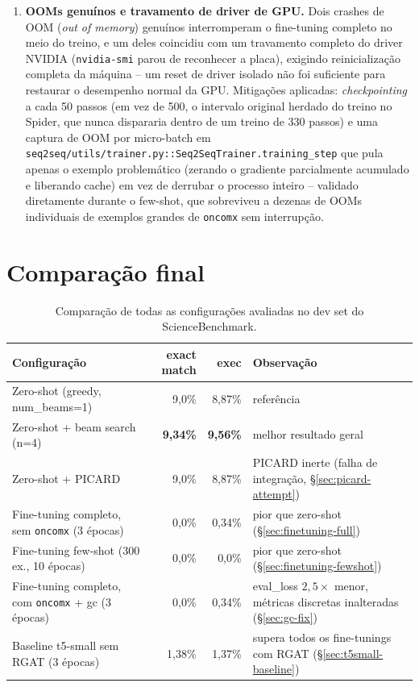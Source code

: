 \begin{enumerate}
\item[(vi)] \textbf{OOMs genuínos e travamento de driver de GPU.} Dois
crashes de OOM (\emph{out of memory}) genuínos interromperam o fine-tuning
completo no meio do treino, e um deles coincidiu com um travamento
completo do driver NVIDIA (\texttt{nvidia-smi} parou de reconhecer a
placa), exigindo reinicialização completa da máquina -- um reset de driver
isolado não foi suficiente para restaurar o desempenho normal da GPU.
Mitigações aplicadas: \emph{checkpointing} a cada 50 passos (em vez de 500,
o intervalo original herdado do treino no Spider, que nunca dispararia
dentro de um treino de 330 passos) e uma captura de OOM por micro-batch em
\texttt{seq2seq/utils/trainer.py::Seq2SeqTrainer.training\_step} que pula
apenas o exemplo problemático (zerando o gradiente parcialmente acumulado
e liberando cache) em vez de derrubar o processo inteiro -- validado
diretamente durante o few-shot, que sobreviveu a dezenas de OOMs
individuais de exemplos grandes de \texttt{oncomx} sem interrupção.
\end{enumerate}

\section{Comparação final}
\label{sec:final-comparison}

\begin{table}[h]
\centering
\caption{Comparação de todas as configurações avaliadas no dev set do ScienceBenchmark.}
\label{tab:final-comparison}
\begin{tabular}{lrrl}
\toprule
\textbf{Configuração} & \textbf{exact match} & \textbf{exec} & \textbf{Observação} \\
\midrule
Zero-shot (greedy, num\_beams=1)  & 9,0\%  & 8,87\% & referência \\
Zero-shot + beam search (n=4)      & \textbf{9,34\%} & \textbf{9,56\%} & melhor resultado geral \\
Zero-shot + PICARD                 & 9,0\%  & 8,87\% & PICARD inerte (falha de integração, \S\ref{sec:picard-attempt}) \\
Fine-tuning completo, sem \texttt{oncomx} (3 épocas)    & 0,0\%  & 0,34\% & pior que zero-shot (\S\ref{sec:finetuning-full}) \\
Fine-tuning few-shot (300 ex., 10 épocas) & 0,0\% & 0,0\% & pior que zero-shot (\S\ref{sec:finetuning-fewshot}) \\
Fine-tuning completo, com \texttt{oncomx} + gc (3 épocas) & 0,0\% & 0,34\% & eval\_loss $2,5\times$ menor, métricas discretas inalteradas (\S\ref{sec:gc-fix}) \\
Baseline t5-small sem RGAT (3 épocas)     & 1,38\% & 1,37\% & supera todos os fine-tunings com RGAT (\S\ref{sec:t5small-baseline}) \\
\bottomrule
\end{tabular}
\end{table}

